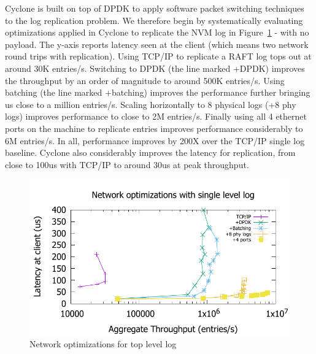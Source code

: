 \documentclass[pageno]{jpaper}
\begin{document}
Cyclone is built on top of DPDK to apply software packet switching techniques to
the log replication problem. We therefore begin by systematically evaluating
optimizations applied in Cyclone to replicate the NVM log in
Figure~\ref{fig:network_opts} - with no payload. The y-axis reports latency seen
at the client (which means two network round trips with replication). Using
TCP/IP to replicate a RAFT log tops out at around 30K entries/s.  Switching to
DPDK (the line marked +DPDK) improves the throughput by an order of magnitude to
around 500K entries/s. Using batching (the line marked +batching) improves the
performance further bringing us close to a million entries/s. Scaling
horizontally to 8 physical logs (+8 phy logs) improves performance to close to
2M entries/s. Finally using all 4 ethernet ports on the machine to replicate
entries improves performance considerably to 6M entries/s. In all, performance
improves by 200X over the TCP/IP single log baseline. Cyclone also considerably
improves the latency for replication, from close to 100us with TCP/IP to around
30us at peak throughput.

\begin{figure}
\includegraphics[scale=0.6]{results2/network_opts.pdf}
\caption{Network optimizations for top level log}
\label{fig:network_opts}
\end{figure}
\end{document}
